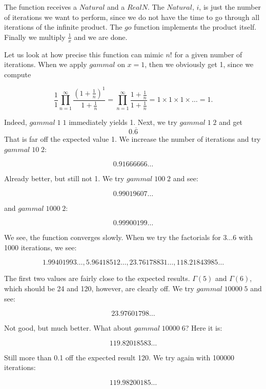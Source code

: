 \documentclass[tikz]{scrreprt}
\newcommand{\Conid}[1]{\mathit{#1}}
\newcommand{\Varid}[1]{\mathit{#1}}
\begin{document}
The function receives a \ensuremath{\Conid{Natural}} and a \ensuremath{\Conid{RealN}}.
The \ensuremath{\Conid{Natural}}, $i$, is just the number of iterations
we want to perform, since we do not have the time
to go through all iterations of the infinite product.
The \ensuremath{\Varid{go}} function implements the product itself.
Finally we multiply $\frac{1}{x}$ and we are done.

Let us look at how precise this function can mimic $n!$
for a given number of iterations. 
When we apply \ensuremath{\Varid{gammal}} on $x=1$,
then we obviously get 1, since we compute

\[
\frac{1}{1}\prod_{n=1}^{\infty}{
\frac{(1+\frac{1}{n})^1}{1+\frac{1}{n}}} =
\prod_{n=1}^{\infty}{
\frac{1+\frac{1}{n}}{1+\frac{1}{n}}} =
1\times 1\times 1\times\dots = 1.
\]

Indeed, \ensuremath{\Varid{gammal}\;\mathrm{1}\;\mathrm{1}} immediately yields 1.
Next, we try \ensuremath{\Varid{gammal}\;\mathrm{1}\;\mathrm{2}} and get 
\[
0.\overline{6}
\]
That is far off the expected value 1.
We increase the number of iterations and try
\ensuremath{\Varid{gammal}\;\mathrm{10}\;\mathrm{2}}:

\[
0.91666666\dots
\]

Already better, but still not 1.
We try \ensuremath{\Varid{gammal}\;\mathrm{100}\;\mathrm{2}} and see:

\[
0.99019607\dots
\]

and \ensuremath{\Varid{gammal}\;\mathrm{1000}\;\mathrm{2}}:

\[
0.99900199\dots
\]

We see, the function converges slowly.
When we try the factorials for $3\dots 6$ 
with \num{1000} iterations, we see:

\[
1.99401993\dots,5.96418512\dots,23.76178831\dots,118.21843985\dots
\]

The first two values are fairly close to the expected results.
$\Gamma(5)$ and $\Gamma(6)$, which should be
24 and 120, however, are clearly off.
We try \ensuremath{\Varid{gammal}\;\mathrm{10000}\;\mathrm{5}} and see:

\[
23.97601798\dots
\]

Not good, but much better.
What about \ensuremath{\Varid{gammal}\;\mathrm{10000}\;\mathrm{6}}?
Here it is:

\[
119.82018583\dots
\]

Still more than 0.1 off the expected result 120.
We try again with \num{100000} iterations:

\[
119.98200185\dots
\]
\end{document}
